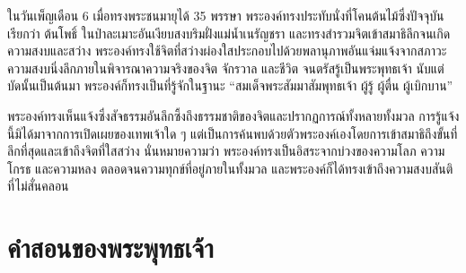 \documentclass[12pt, openany]{book}
\begin{document}
ใน{\wbr}วันเพ็ญ{\wbr}เดือน 6 เมื่อ{\wbr}ทรง{\wbr}พระ{\wbr}ชนมายุ{\wbr}ได้ 35 พรรษา พระองค์{\wbr}ทรง{\wbr}ประทับ{\wbr}นั่ง{\wbr}ที่{\wbr}โคน{\wbr}ต้นไม้{\wbr}ซึ่ง{\wbr}ปัจจุบัน{\wbr}เรียก{\wbr}ว่า ต้น{\wbr}โพธิ์ ใน{\wbr}ป่าละเมาะ{\wbr}อัน{\wbr}เงียบ{\wbr}สงบ{\wbr}ริม{\wbr}ฝั่ง{\wbr}แม่น้ำ{\wbr}เนรัญชรา และ{\wbr}ทรง{\wbr}สำรวม{\wbr}จิต{\wbr}เข้า{\wbr}สมาธิ{\wbr}ลึก{\wbr}จน{\wbr}เกิด{\wbr}ความ{\wbr}สงบ{\wbr}และ{\wbr}สว่าง  พระองค์{\wbr}ทรง{\wbr}ใช้{\wbr}จิต{\wbr}ที่{\wbr}สว่าง{\wbr}ผ่องใส{\wbr}ประกอบ{\wbr}ไป{\wbr}ด้วย{\wbr}พลานุภาพ{\wbr}อัน{\wbr}แจ่มแจ้ง{\wbr}จาก{\wbr}สภาวะ{\wbr}ความ{\wbr}สงบ{\wbr}นิ่ง{\wbr}ลึก{\wbr}ภายใน{\wbr}พิจารณา{\wbr}ความ{\wbr}จริง{\wbr}ของ{\wbr}จิต จักรวาล และ{\wbr}ชีวิต จน{\wbr}ตรัสรู้{\wbr}เป็น{\wbr}พระพุทธเจ้า  นับ{\wbr}แต่{\wbr}บัดนั้น{\wbr}เป็นต้น{\wbr}มา พระองค์{\wbr}ก็{\wbr}ทรง{\wbr}เป็น{\wbr}ที่{\wbr}รู้จัก{\wbr}ใน{\wbr}ฐานะ “สมเด็จ{\wbr}พระ{\wbr}สัมมา{\wbr}สัมพุทธ{\wbr}เจ้า ผู้{\wbr}รู้ ผู้{\wbr}ตื่น ผู้{\wbr}เบิกบาน” 

พระองค์{\wbr}ทรง{\wbr}เห็น{\wbr}แจ้ง{\wbr}ซึ่ง{\wbr}สัจธรรม{\wbr}อัน{\wbr}ลึกซึ้ง{\wbr}ถึง{\wbr}ธรรมชาติ{\wbr}ของ{\wbr}จิต{\wbr}และ{\wbr}ปรากฏการณ์{\wbr}ทั้งหลาย{\wbr}ทั้งมวล  การ{\wbr}รู้แจ้ง{\wbr}นี้{\wbr}มิ{\wbr}ได้{\wbr}มา{\wbr}จาก{\wbr}การ{\wbr}เปิดเผย{\wbr}ของ{\wbr}เทพเจ้า{\wbr}ใด ๆ แต่{\wbr}เป็น{\wbr}การ{\wbr}ค้น{\wbr}พบ{\wbr}ด้วย{\wbr}ตัว{\wbr}พระองค์{\wbr}เอง{\wbr}โดย{\wbr}การ{\wbr}เข้า{\wbr}สมาธิ{\wbr}ถึง{\wbr}ขั้น{\wbr}ที่{\wbr}ลึก{\wbr}ที่สุด{\wbr}และ{\wbr}เข้าถึง{\wbr}จิต{\wbr}ที่{\wbr}ใส{\wbr}สว่าง  นั่น{\wbr}หมายความ{\wbr}ว่า พระองค์{\wbr}ทรง{\wbr}เป็น{\wbr}อิสระ{\wbr}จาก{\wbr}บ่วง{\wbr}ของ{\wbr}ความ{\wbr}โลภ ความ{\wbr}โกรธ และ{\wbr}ความ{\wbr}หลง ตลอด{\wbr}จน{\wbr}ความ{\wbr}ทุกข์{\wbr}ที่{\wbr}อยู่{\wbr}ภายใน{\wbr}ทั้งมวล  และ{\wbr}พระองค์{\wbr}ก็{\wbr}ได้{\wbr}ทรง{\wbr}เข้าถึง{\wbr}ความ{\wbr}สงบ{\wbr}สันติ{\wbr}ที่ ไม่{\wbr}สั่น{\wbr}คลอน

\chapter*{คำ{\wbr}สอน{\wbr}ของ{\wbr}พระพุทธเจ้า}
\end{document}
